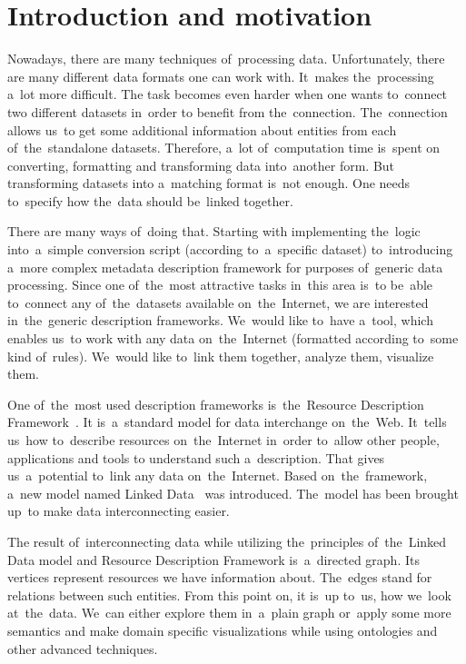 \chapter*{Introduction and motivation}
\label{ch:preface}
Nowadays, there are many techniques of~processing data. Unfortunately, there are many
different data formats one can work with. It~makes the~processing a~lot more difficult.
The task becomes even harder when one wants to~connect two different datasets in~order to
benefit from the~connection. The~connection allows us~to get some additional information
about entities from each of~the~standalone datasets. Therefore, a~lot of~computation time is~spent
on converting, formatting and transforming data into~another form. But transforming datasets
into a~matching format is~not enough. One needs to~specify how the~data should be~linked
together.

There are many ways of~doing that. Starting with implementing the~logic into~a~simple conversion
script (according to~a~specific dataset) to~introducing a~more complex metadata description
framework for purposes of~generic data processing. Since one of~the~most attractive
tasks in~this area is~to be~able to~connect any of~the~datasets available on~the~Internet,
we are interested in~the~generic description frameworks. We~would like to~have 
a~tool, 
which enables us~to work with any data on~the~Internet (formatted according to~some
kind of~rules). We~would like to~link them together, analyze them, visualize 
them.

One of~the~most used description frameworks is~the~Resource Description Framework~\cite{rdf}.
It is~a~standard model for data interchange on~the~Web. It~tells us~how to~describe
resources on~the~Internet in~order to~allow other people, applications and tools
to understand such a~description. That gives us~a~potential to~link any data on~the~Internet.
Based on~the~framework, a~new model named Linked Data~\cite{ld} was introduced. The~model
has been brought up~to make data interconnecting easier.

The result of~interconnecting data while utilizing the~principles of~the~Linked Data model
and Resource Description Framework is~a~directed graph. Its vertices represent resources we
have information about. The~edges stand for relations between such entities. From this point on,
it is~up to~us, how we~look at~the~data. We~can either explore them in~a~plain graph or~apply
some more semantics and make domain specific visualizations while using ontologies
and other advanced techniques.

